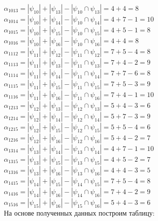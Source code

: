 \documentclass[12pt,a4paper]{report}
\begin{document}
$\alpha_{1013} = |\psi_{10}| + |\psi_{13}| - |\psi_{10} \cap \psi_{13}| = 4 + 4 = 8$ \\
$\alpha_{1014} = |\psi_{10}| + |\psi_{14}| - |\psi_{10} \cap \psi_{14}| = 4 + 7 - 1 = 10$ \\
$\alpha_{1015} = |\psi_{10}| + |\psi_{15}| - |\psi_{10} \cap \psi_{15}| = 4 + 5 - 1 = 8$ \\
$\alpha_{1016} = |\psi_{10}| + |\psi_{16}| - |\psi_{10} \cap \psi_{16}| = 4 + 4 = 8$ \\
$\alpha_{1112} = |\psi_{11}| + |\psi_{12}| - |\psi_{11} \cap \psi_{12}| = 7 + 5 - 4 = 8$ \\
$\alpha_{1113} = |\psi_{11}| + |\psi_{13}| - |\psi_{11} \cap \psi_{13}| = 7 + 4 - 2 = 9$ \\
$\alpha_{1114} = |\psi_{11}| + |\psi_{14}| - |\psi_{11} \cap \psi_{14}| = 7 + 7 - 6 = 8$ \\
$\alpha_{1115} = |\psi_{11}| + |\psi_{15}| - |\psi_{11} \cap \psi_{15}| = 7 + 5 - 3 = 9$ \\
$\alpha_{1116} = |\psi_{11}| + |\psi_{16}| - |\psi_{11} \cap \psi_{16}| = 7 + 4 - 1 = 10$ \\
$\alpha_{1213} = |\psi_{12}| + |\psi_{13}| - |\psi_{12} \cap \psi_{13}| = 5 + 4 - 3 = 6$ \\
$\alpha_{1214} = |\psi_{12}| + |\psi_{14}| - |\psi_{12} \cap \psi_{14}| = 5 + 7 - 3 = 9$ \\
$\alpha_{1215} = |\psi_{12}| + |\psi_{15}| - |\psi_{12} \cap \psi_{15}| = 5 + 5 - 4 = 6$ \\
$\alpha_{1216} = |\psi_{12}| + |\psi_{16}| - |\psi_{12} \cap \psi_{16}| = 5 + 4 - 2 = 7$ \\
$\alpha_{1314} = |\psi_{13}| + |\psi_{14}| - |\psi_{13} \cap \psi_{14}| = 4 + 7 - 1 = 10$ \\
$\alpha_{1315} = |\psi_{13}| + |\psi_{15}| - |\psi_{13} \cap \psi_{15}| = 4 + 5 - 2 = 7$ \\
$\alpha_{1316} = |\psi_{13}| + |\psi_{16}| - |\psi_{13} \cap \psi_{16}| = 4 + 4 - 3 = 5$ \\
$\alpha_{1415} = |\psi_{14}| + |\psi_{15}| - |\psi_{14} \cap \psi_{15}| = 7 + 5 - 4 = 8$ \\
$\alpha_{1416} = |\psi_{14}| + |\psi_{16}| - |\psi_{14} \cap \psi_{16}| = 7 + 4 - 2 = 9$ \\
$\alpha_{1516} = |\psi_{15}| + |\psi_{16}| - |\psi_{15} \cap \psi_{16}| = 5 + 4 - 3 = 6$ \\
\hfill\break
На основе полученных данных построим таблицу:\\
\end{document}

